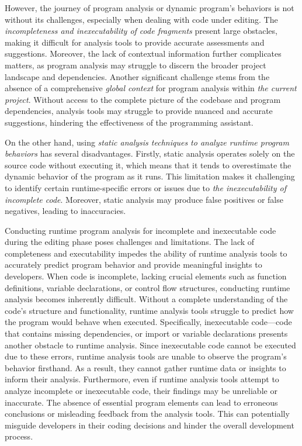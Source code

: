However, the journey of program analysis or dynamic program's
behaviors is not without its challenges, especially when dealing with
code under editing. The {\em incompleteness and inexecutability of
code fragments} present large obstacles, making it difficult for
analysis tools to provide accurate assessments and
suggestions. Moreover, the lack of contextual information further
complicates matters, as program analysis may struggle to discern the
broader project landscape and dependencies. Another significant
challenge stems from the absence of a comprehensive {\em global
context} for program analysis within {\em the current
project}. Without access to the complete picture of the codebase and
program dependencies, analysis tools may struggle to provide nuanced
and accurate suggestions, hindering the effectiveness of the
programming assistant.

On the other hand, using {\em static analysis techniques to analyze
runtime program behaviors} has several disadvantages. Firstly, static
analysis operates solely on the source code without executing it,
which means that it tends to overestimate the dynamic behavior of the
program as it runs. This limitation makes it challenging to identify
certain runtime-specific errors or issues due to {\em the inexecutability
of incomplete code}. Moreover, static analysis may produce false
positives or false negatives, leading to inaccuracies.

Conducting runtime program analysis for incomplete and inexecutable
code during the editing phase poses challenges and
limitations. The lack of completeness and executability impedes the
ability of runtime analysis tools to accurately predict program
behavior and provide meaningful insights to developers.  When code is
incomplete, lacking crucial elements such as function definitions,
variable declarations, or control flow structures, conducting runtime
analysis becomes inherently difficult. Without a complete
understanding of the code's structure and functionality, runtime
analysis tools struggle to predict how the program would behave when
executed. Specifically, inexecutable code—code that contains missing
dependencies, or import or variable declarations presents another
obstacle to runtime analysis. Since inexecutable code cannot be
executed due to these errors, runtime analysis tools are unable to
observe the program's behavior firsthand. As a result, they cannot
gather runtime data or insights to inform their analysis.
%
Furthermore, even if runtime analysis tools attempt to analyze
incomplete or inexecutable code, their findings may be unreliable or
inaccurate. The absence of essential program elements can lead to
erroneous conclusions or misleading feedback from the analysis
tools. This can potentially misguide developers in their coding
decisions and hinder the overall development process.

